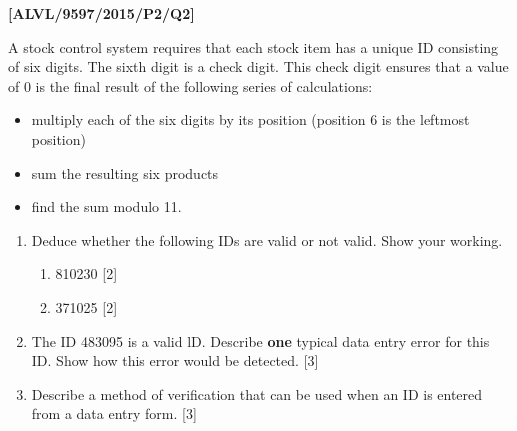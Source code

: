 \item \textbf{{[}ALVL/9597/2015/P2/Q2{]} }

A stock control system requires that each stock item has a unique
ID consisting of six digits. The sixth digit is a check digit. This
check digit ensures that a value of 0 is the final result of the following
series of calculations:
\begin{itemize}
\item multiply each of the six digits by its position (position 6 is the
leftmost position)
\item sum the resulting six products
\item find the sum modulo 11.
\end{itemize}
\begin{enumerate}
\item Deduce whether the following IDs are valid or not valid. Show your
working. 
\begin{enumerate}
\item 810230 \hfill{}{[}2{]}
\item 371025 \hfill{}{[}2{]}
\end{enumerate}
\item The ID 483095 is a valid lD. Describe \textbf{one} typical data entry
error for this ID. Show how this error would be detected.\hfill{}
{[}3{]}
\item Describe a method of verification that can be used when an ID is entered
from a data entry form.\hfill{} {[}3{]}
\end{enumerate}